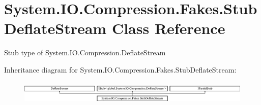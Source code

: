 \hypertarget{class_system_1_1_i_o_1_1_compression_1_1_fakes_1_1_stub_deflate_stream}{\section{System.\-I\-O.\-Compression.\-Fakes.\-Stub\-Deflate\-Stream Class Reference}
\label{class_system_1_1_i_o_1_1_compression_1_1_fakes_1_1_stub_deflate_stream}
}


Stub type of System.\-I\-O.\-Compression.\-Deflate\-Stream 


Inheritance diagram for System.\-I\-O.\-Compression.\-Fakes.\-Stub\-Deflate\-Stream\-:\begin{figure}[H]
\begin{center}
\leavevmode
\includegraphics[height=1.141692cm]{class_system_1_1_i_o_1_1_compression_1_1_fakes_1_1_stub_deflate_stream}
\end{center}
\end{figure}
